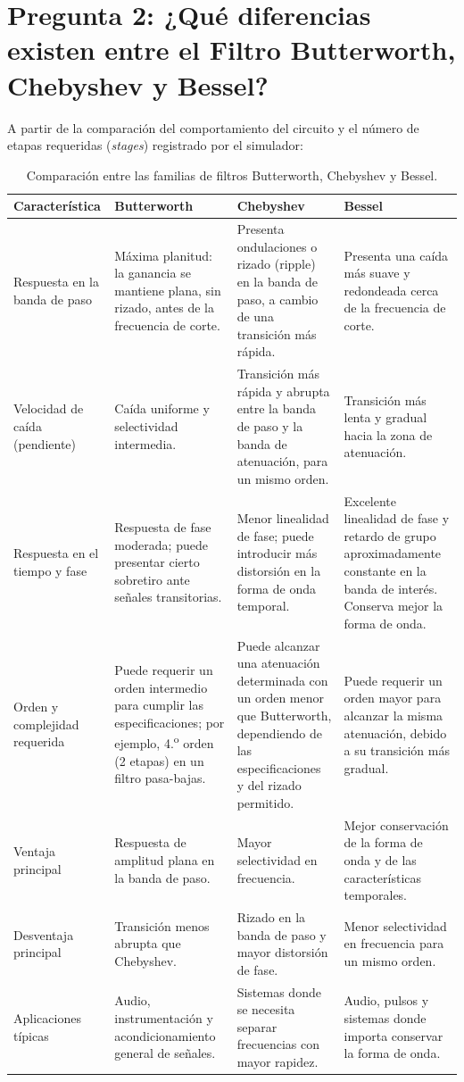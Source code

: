 \section{Pregunta 2: ¿Qué diferencias existen entre el Filtro Butterworth, Chebyshev y Bessel?}

A partir de la comparación del comportamiento del circuito y el número de etapas requeridas (\textit{stages}) registrado por el simulador:

\begin{table}[H]
	\centering
	\footnotesize
	\renewcommand{\arraystretch}{1.3}
	\begin{tabular}{|p{2.3cm}|p{4.4cm}|p{4.4cm}|p{4.4cm}|}
		\hline
		\textbf{Característica} & \textbf{Butterworth} & \textbf{Chebyshev} & \textbf{Bessel} \\
		\hline
		Respuesta en la banda de paso & Máxima planitud: la ganancia se mantiene plana, sin rizado, antes de la frecuencia de corte. & Presenta ondulaciones o rizado (ripple) en la banda de paso, a cambio de una transición más rápida. & Presenta una caída más suave y redondeada cerca de la frecuencia de corte. \\
		\hline
		Velocidad de caída (pendiente) & Caída uniforme y selectividad intermedia. & Transición más rápida y abrupta entre la banda de paso y la banda de atenuación, para un mismo orden. & Transición más lenta y gradual hacia la zona de atenuación. \\
		\hline
		Respuesta en el tiempo y fase & Respuesta de fase moderada; puede presentar cierto sobretiro ante señales transitorias. & Menor linealidad de fase; puede introducir más distorsión en la forma de onda temporal. & Excelente linealidad de fase y retardo de grupo aproximadamente constante en la banda de interés. Conserva mejor la forma de onda. \\
		\hline
		Orden y complejidad requerida & Puede requerir un orden intermedio para cumplir las especificaciones; por ejemplo, 4.\textsuperscript{o} orden (2 etapas) en un filtro pasa-bajas. & Puede alcanzar una atenuación determinada con un orden menor que Butterworth, dependiendo de las especificaciones y del rizado permitido. & Puede requerir un orden mayor para alcanzar la misma atenuación, debido a su transición más gradual. \\
		\hline
		Ventaja principal & Respuesta de amplitud plana en la banda de paso. & Mayor selectividad en frecuencia. & Mejor conservación de la forma de onda y de las características temporales. \\
		\hline
		Desventaja principal & Transición menos abrupta que Chebyshev. & Rizado en la banda de paso y mayor distorsión de fase. & Menor selectividad en frecuencia para un mismo orden. \\
		\hline
		Aplicaciones típicas & Audio, instrumentación y acondicionamiento general de señales. & Sistemas donde se necesita separar frecuencias con mayor rapidez. & Audio, pulsos y sistemas donde importa conservar la forma de onda. \\
		\hline
	\end{tabular}
	\caption{Comparación entre las familias de filtros Butterworth, Chebyshev y Bessel.}
	\label{tab:comparacion_familias}
\end{table}
